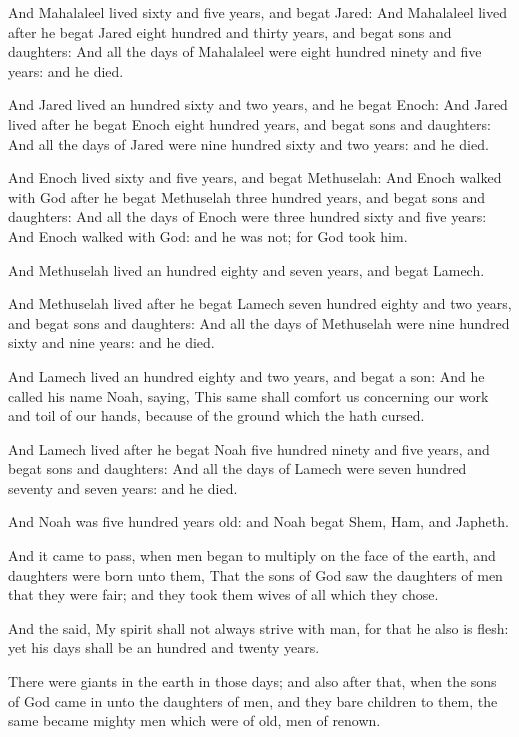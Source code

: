 \Verse And Mahalaleel lived sixty and five years, and begat Jared: \Verse And Mahalaleel lived after he begat Jared eight hundred and thirty years, and begat sons and daughters: \Verse And all the days of Mahalaleel were eight hundred ninety and five years: and he died.

\Verse And Jared lived an hundred sixty and two years, and he begat Enoch: \Verse And Jared lived after he begat Enoch eight hundred years, and begat sons and daughters: \Verse And all the days of Jared were nine hundred sixty and two years: and he died.

\Verse And Enoch lived sixty and five years, and begat Methuselah: \Verse And Enoch walked with God after he begat Methuselah three hundred years, and begat sons and daughters: \Verse And all the days of Enoch were three hundred sixty and five years: \Verse And Enoch walked with God: and he was not; for God took him.

\Verse And Methuselah lived an hundred eighty and seven years, and begat Lamech.

\Verse And Methuselah lived after he begat Lamech seven hundred eighty and two years, and begat sons and daughters: \Verse And all the days of Methuselah were nine hundred sixty and nine years: and he died.

\Verse And Lamech lived an hundred eighty and two years, and begat a son: \Verse And he called his name Noah, saying, This same shall comfort us concerning our work and toil of our hands, because of the ground which the \LORD hath cursed.

\Verse And Lamech lived after he begat Noah five hundred ninety and five years, and begat sons and daughters: \Verse And all the days of Lamech were seven hundred seventy and seven years: and he died.

\Verse And Noah was five hundred years old: and Noah begat Shem, Ham, and Japheth.

\Chapter
\Verse And it came to pass, when men began to multiply on the face of the earth, and daughters were born unto them, \Verse That the sons of God saw the daughters of men that they were fair; and they took them wives of all which they chose.

\Verse And the \LORD said, My spirit shall not always strive with man, for that he also is flesh: yet his days shall be an hundred and twenty years.

\Verse There were giants in the earth in those days; and also after that, when the sons of God came in unto the daughters of men, and they bare children to them, the same became mighty men which were of old, men of renown.

